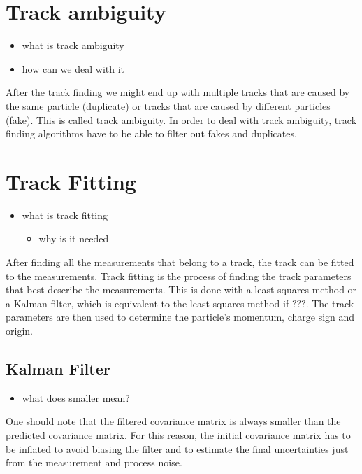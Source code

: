 \section{Track ambiguity}

\begin{itemize}
    \color{red}
    \item what is track ambiguity
    \item how can we deal with it
\end{itemize}

After the track finding we might end up with multiple tracks that are caused by the same particle (duplicate) or tracks that are caused by different particles (fake). This is called track ambiguity. In order to deal with track ambiguity, track finding algorithms have to be able to filter out fakes and duplicates.

\section{Track Fitting}

\begin{itemize}
    \color{red}
    \item what is track fitting
    \begin{itemize}
        \item why is it needed
    \end{itemize}
\end{itemize}

After finding all the measurements that belong to a track, the track can be fitted to the measurements. Track fitting is the process of finding the track parameters that best describe the measurements. This is done with a least squares method or a Kalman filter, which is equivalent to the least squares method if {\color{red}???}. The track parameters are then used to determine the particle's momentum, charge sign and origin.

\subsection{Kalman Filter}

\begin{itemize}
    \color{red}
    \item what does smaller mean?
\end{itemize}

One should note that the filtered covariance matrix is always smaller than the predicted covariance matrix. For this reason, the initial covariance matrix has to be inflated to avoid biasing the filter and to estimate the final uncertainties just from the measurement and process noise.

